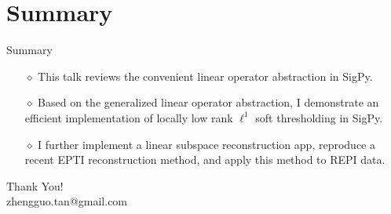 \section{Summary}

\begin{frame}{Summary}
\begin{itemize}
	\item [$\diamond$] This talk reviews the convenient linear operator abstraction in SigPy.
	\vspace{1em}
	\item [$\diamond$] Based on the generalized linear operator abstraction, I demonstrate an efficient implementation of locally low rank $\ell^1$ soft thresholding in SigPy.
	\vspace{1em}
	\item [$\diamond$] I further implement a linear subspace reconstruction app, reproduce a recent EPTI reconstruction method, and apply this method to REPI data.
\end{itemize}

\vfill

\hfill Thank You! \\
\hfill zhengguo.tan@gmail.com
\end{frame}